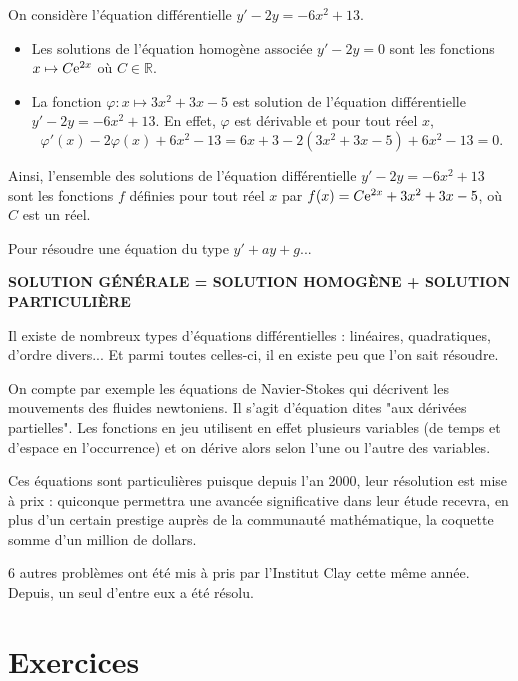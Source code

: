 \documentclass[11pt,fleqn, openany]{book} %
\begin{document}
\begin{example} On considère l'équation différentielle $y'-2y=-6x^2+13$.
\begin{itemize}
\item Les solutions de l'équation homogène associée $y'-2y=0$ sont les fonctions $x\mapsto C\mathrm{e}^{2x}$ où $C\in\mathbb{R}$.
\item La fonction $\varphi:x\mapsto 3x^2+3x-5$ est solution de l'équation différentielle $y'-2y=-6x^2+13$. En effet, $\varphi$ est dérivable et pour tout réel $x$, 
\[\varphi'(x)-2\varphi(x)+6x^2-13=6x+3-2(3x^2+3x-5)+6x^2-13=0.\]
\end{itemize}
Ainsi, l'ensemble des solutions de l'équation différentielle $y'-2y=-6x^2+13$ sont les fonctions $f$ définies pour tout réel $x$ par $f(x)=C\mathrm{e}^{2x}+3x^2+3x-5$, où $C$ est un réel.\end{example}

\begin{proposition} Pour résoudre une équation du type $y'+ay+g$...
\begin{center}
\textbf{SOLUTION GÉNÉRALE = SOLUTION HOMOGÈNE + SOLUTION PARTICULIÈRE}
\end{center}\vspace{-0.5cm}\end{proposition}


Il existe de nombreux types d'équations différentielles : linéaires, quadratiques, d'ordre divers... Et parmi toutes celles-ci, il en existe peu que l'on sait résoudre.

On compte par exemple les équations de Navier-Stokes qui décrivent les mouvements des fluides newtoniens. Il s'agit d'équation dites "aux dérivées partielles". Les fonctions en jeu utilisent en effet plusieurs variables (de temps et d'espace en l'occurrence) et on dérive alors selon l'une ou l'autre des variables.

Ces équations sont particulières puisque depuis l'an 2000, leur résolution est mise à prix : quiconque permettra une avancée significative dans leur étude recevra, en plus d'un certain prestige auprès de la communauté mathématique, la coquette somme d'un million de dollars. 

6 autres problèmes ont été mis à pris par l'Institut Clay cette même année. Depuis, un seul d'entre eux a été résolu.


\chapter{Exercices}
\end{document}
